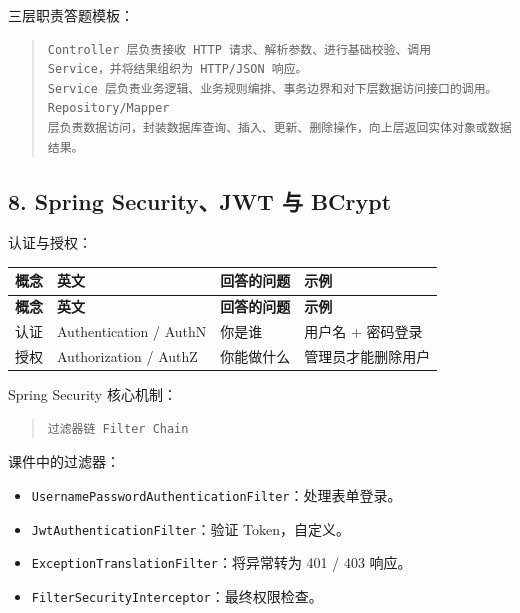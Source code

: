 \documentclass[UTF8,zihao=-4]{ctexart}
\begin{document}
三层职责答题模板：

\begin{quote}
\footnotesize
\begin{verbatim}
Controller 层负责接收 HTTP 请求、解析参数、进行基础校验、调用 
Service，并将结果组织为 HTTP/JSON 响应。
Service 层负责业务逻辑、业务规则编排、事务边界和对下层数据访问接口的调用。
Repository/Mapper 
层负责数据访问，封装数据库查询、插入、更新、删除操作，向上层返回实体对象或数据结果。
\end{verbatim}
\end{quote}

\subsection{8. Spring Security、JWT 与 BCrypt}

认证与授权：

{
\footnotesize
\begin{longtable}{|>{\raggedright\arraybackslash}p{}|>{\raggedright\arraybackslash}p{}|>{\raggedright\arraybackslash}p{}|>{\raggedright\arraybackslash}p{}|}
\hline
\textbf{概念} & \textbf{英文} & \textbf{回答的问题} & \textbf{示例} \\
\hline
\endfirsthead
\hline
\textbf{概念} & \textbf{英文} & \textbf{回答的问题} & \textbf{示例} \\
\hline
\endhead
认证 & Authentication / AuthN & 你是谁 & 用户名 + 密码登录 \\
\hline
授权 & Authorization / AuthZ & 你能做什么 & 管理员才能删除用户 \\
\hline
\end{longtable}
}


Spring Security 核心机制：

\begin{quote}
\footnotesize
\begin{verbatim}
过滤器链 Filter Chain
\end{verbatim}
\end{quote}

课件中的过滤器：

\begin{itemize}
\item \texttt{UsernamePasswordAuthenticationFilter}：处理表单登录。
\item \texttt{JwtAuthenticationFilter}：验证 Token，自定义。
\item \texttt{ExceptionTranslationFilter}：将异常转为 401 / 403 响应。
\item \texttt{FilterSecurityInterceptor}：最终权限检查。
\end{itemize}
\end{document}
